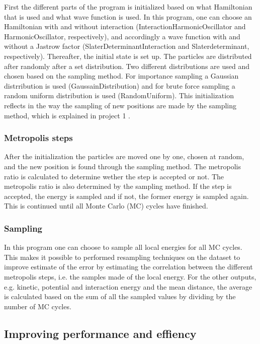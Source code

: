 First the different parts of the program is initialized based on what Hamiltonian that is used and what wave function is used. In this program, one can choose an Hamiltonian with and without interaction (InteractionHarmonicOscillator and HarmonicOscillator, respectively), and accordingly a wave function with and without a Jastrow factor (SlaterDeterminantInteraction and Slaterdeterminant, respectively). Thereafter, the initial state is set up. The particles are distributed after randomly after a set distribution. Two different distributions are used and chosen based on the sampling method. For importance sampling a Gaussian distrribution is used (GaussainDistribution) and for brute force sampling a random uniform distribution is used (RandomUniform). This initialization reflects in the way the sampling of new positions are made by the sampling method, which is explained in project 1 \cite{project1}.

\subsubsection{Metropolis steps}

After the initialization the particles are moved one by one, chosen at random, and the new position is found through the sampling method. The metropolis ratio is calculated to determine wether the step is accepted or not. The metropolis ratio is also determined by the sampling method. If the step is accepted, the energy is sampled and if not, the former energy is sampled again. This is continued until all Monte Carlo (MC) cycles have finished. 

\subsubsection{Sampling}

In this program one can choose to sample all local energies for all MC cycles. This makes it possible to performed resampling techniques on the dataset to improve estimate of the error by estimating the correlation between the different metropolis steps, i.e. the samples made of the local energy. For the other outputs, e.g. kinetic, potential and interaction energy and the mean distance, the average is calculated based on the sum of all the sampled values by dividing by the number of MC cycles.

\subsection{Improving performance and effiency}

